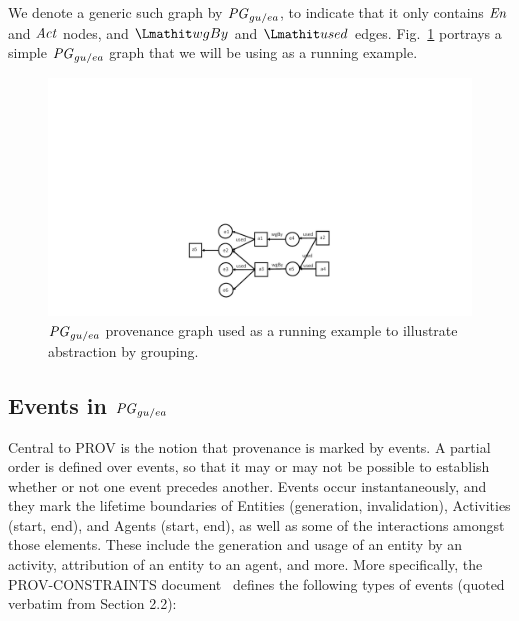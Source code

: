 We denote a generic such graph by $\mathit{PG}_{gu/ea}$, to indicate that it only contains $\mathit{En}$ and $\mathit{Act}$ nodes, and $\wgby$ and $\used$ edges. 
Fig.~\ref{fig:baseline-ug-ae} portrays a simple $\mathit{PG}_{gu/ea}$ graph that we will be using as a running example. 



\begin{figure}
\centering
\includegraphics[scale=.6]{reworked-fig5.pdf} 
\caption{$\mathit{PG}_{gu/ea}$ provenance graph used as a running example to illustrate abstraction by grouping.}  \label{fig:baseline-ug-ae}
\end{figure}

\subsection{Events in $\mathit{PG}_{gu/ea}$}  \label{sec:prov-events}

\label{sec:events}

Central to PROV is the notion that provenance is marked by events. A partial order is defined over events, so that it may or may not be possible to establish whether or not one event precedes another. 
%
Events occur instantaneously, and they mark the lifetime boundaries of Entities (generation, invalidation), Activities (start, end), and Agents (start, end), as well as some of the interactions amongst those elements. These include the generation and usage of an entity by an activity, attribution of an entity to an agent, and more. More specifically, the PROV-CONSTRAINTS document~\citep{w3c-prov-constraints} defines the following types of events (quoted verbatim from Section 2.2):

